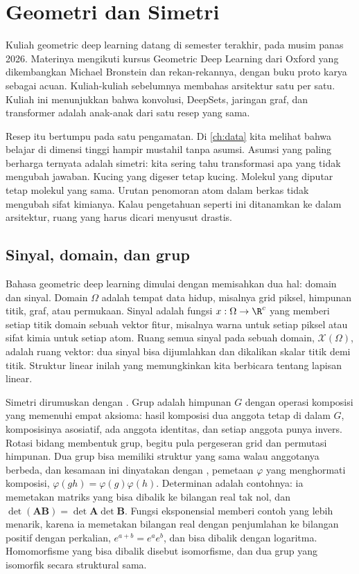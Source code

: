\chapter{Geometri dan Simetri}
\label{ch:gdl}

Kuliah geometric deep learning datang di semester terakhir, pada musim panas 2026. Materinya
mengikuti kursus Geometric Deep Learning dari Oxford yang dikembangkan Michael Bronstein dan
rekan-rekannya, dengan buku proto karya \citet{bronstein2021} sebagai acuan. Kuliah-kuliah sebelumnya
membahas arsitektur satu per satu. Kuliah ini menunjukkan bahwa konvolusi, DeepSets, jaringan graf,
dan transformer adalah anak-anak dari satu resep yang sama.

Resep itu bertumpu pada satu pengamatan. Di \cref{ch:data} kita melihat bahwa belajar di dimensi
tinggi hampir mustahil tanpa asumsi. Asumsi yang paling berharga ternyata adalah simetri: kita
sering tahu transformasi apa yang tidak mengubah jawaban. Kucing yang digeser tetap kucing.
Molekul yang diputar tetap molekul yang sama. Urutan penomoran atom dalam berkas tidak mengubah
sifat kimianya. Kalau pengetahuan seperti ini ditanamkan ke dalam arsitektur, ruang yang harus
dicari menyusut drastis.

\section{Sinyal, domain, dan grup}

Bahasa geometric deep learning dimulai dengan memisahkan dua hal: domain dan sinyal. Domain
$\Omega$ adalah tempat data hidup, misalnya grid piksel, himpunan titik, graf, atau permukaan.
Sinyal adalah fungsi $x:\Omega\to\R^c$ yang memberi setiap titik domain sebuah vektor fitur,
misalnya warna untuk setiap piksel atau sifat kimia untuk setiap atom. Ruang semua sinyal pada
sebuah domain, $\mathcal X(\Omega)$, adalah ruang vektor: dua sinyal bisa dijumlahkan dan dikalikan
skalar titik demi titik. Struktur linear inilah yang memungkinkan kita berbicara tentang lapisan
linear.

Simetri dirumuskan dengan . Grup adalah himpunan $G$ dengan operasi komposisi yang
memenuhi empat aksioma: hasil komposisi dua anggota tetap di dalam $G$, komposisinya asosiatif,
ada anggota identitas, dan setiap anggota punya invers. Rotasi bidang membentuk grup, begitu pula
pergeseran grid dan permutasi himpunan. Dua grup bisa memiliki struktur yang sama walau anggotanya
berbeda, dan kesamaan ini dinyatakan dengan , pemetaan $\varphi$ yang menghormati
komposisi, $\varphi(gh)=\varphi(g)\varphi(h)$. Determinan adalah contohnya: ia memetakan matriks yang
bisa dibalik ke bilangan real tak nol, dan $\det(\bm A\bm B)=\det\bm A\det\bm B$. Fungsi eksponensial
memberi contoh yang lebih menarik, karena ia memetakan bilangan real dengan penjumlahan ke bilangan
positif dengan perkalian, $e^{a+b}=e^ae^b$, dan bisa dibalik dengan logaritma. Homomorfisme yang
bisa dibalik disebut isomorfisme, dan dua grup yang isomorfik secara struktural sama.

